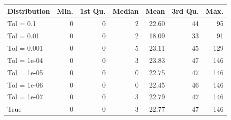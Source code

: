 \begin{figure} 
\begin{tabular}{lrrrrrr}
 Distribution & Min. & 1st Qu. & Median & Mean & 3rd Qu. & Max. \\ 
  \hline
\hline
Tol =  0.1 & 0 & 0 & 2 & 22.60 & 44 & 95 \\ 
  Tol =  0.01 & 0 & 0 & 2 & 18.09 & 33 & 91 \\ 
  Tol =  0.001 & 0 & 0 & 5 & 23.11 & 45 & 129 \\ 
  Tol =  1e-04 & 0 & 0 & 3 & 23.83 & 47 & 146 \\ 
  Tol =  1e-05 & 0 & 0 & 0 & 22.75 & 47 & 146 \\ 
  Tol =  1e-06 & 0 & 0 & 0 & 22.45 & 46 & 146 \\ 
  Tol =  1e-07 & 0 & 0 & 3 & 22.79 & 47 & 146 \\ 
  True & 0 & 0 & 3 & 22.77 & 47 & 146 \\ 
  \end{tabular}
\label{tab:SummaryTable}
\end{figure} 
